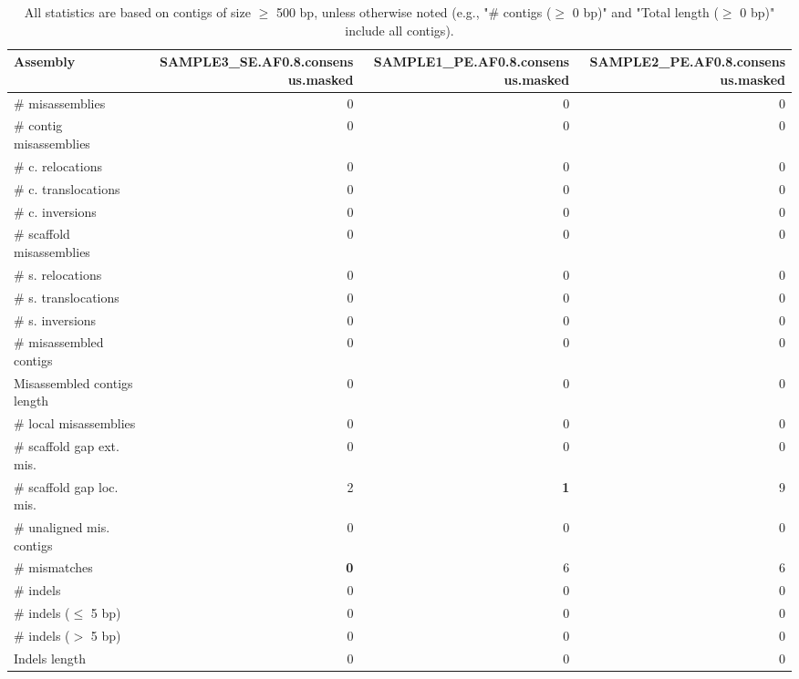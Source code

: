 \documentclass[12pt,a4paper]{article}
\begin{document}
\begin{table}[ht]
\begin{center}
\caption{All statistics are based on contigs of size $\geq$ 500 bp, unless otherwise noted (e.g., "\# contigs ($\geq$ 0 bp)" and "Total length ($\geq$ 0 bp)" include all contigs).}
\begin{tabular}{|l*{3}{|r}|}
\hline
Assembly & SAMPLE3\_SE.AF0.8.consensus.masked & SAMPLE1\_PE.AF0.8.consensus.masked & SAMPLE2\_PE.AF0.8.consensus.masked \\ \hline
\# misassemblies & 0 & 0 & 0 \\ \hline
\hspace{2mm}\# contig misassemblies & 0 & 0 & 0 \\ \hline
\hspace{5mm}\# c. relocations & 0 & 0 & 0 \\ \hline
\hspace{5mm}\# c. translocations & 0 & 0 & 0 \\ \hline
\hspace{5mm}\# c. inversions & 0 & 0 & 0 \\ \hline
\hspace{2mm}\# scaffold misassemblies & 0 & 0 & 0 \\ \hline
\hspace{5mm}\# s. relocations & 0 & 0 & 0 \\ \hline
\hspace{5mm}\# s. translocations & 0 & 0 & 0 \\ \hline
\hspace{5mm}\# s. inversions & 0 & 0 & 0 \\ \hline
\# misassembled contigs & 0 & 0 & 0 \\ \hline
Misassembled contigs length & 0 & 0 & 0 \\ \hline
\# local misassemblies & 0 & 0 & 0 \\ \hline
\# scaffold gap ext. mis. & 0 & 0 & 0 \\ \hline
\# scaffold gap loc. mis. & 2 & {\bf 1} & 9 \\ \hline
\# unaligned mis. contigs & 0 & 0 & 0 \\ \hline
\# mismatches & {\bf 0} & 6 & 6 \\ \hline
\# indels & 0 & 0 & 0 \\ \hline
\hspace{5mm}\# indels ($\leq$ 5 bp) & 0 & 0 & 0 \\ \hline
\hspace{5mm}\# indels ($>$ 5 bp) & 0 & 0 & 0 \\ \hline
Indels length & 0 & 0 & 0 \\ \hline
\end{tabular}
\end{center}
\end{table}
\end{document}
